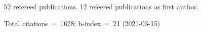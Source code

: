 52 refereed publications. 12 refeered publications as first author.

Total citations~=~1628; h-index~=~21 (2021-03-15)
